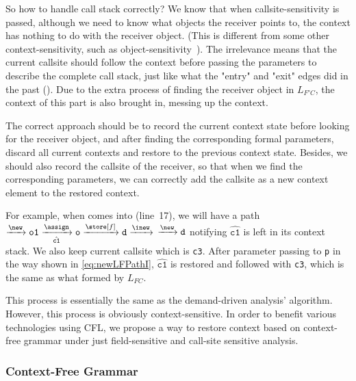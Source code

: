 So how to handle call stack correctly?
We know that when callsite-sensitivity is passed, although we need to know what objects the receiver points to, the context has nothing to do with the receiver object.
(This is different from some other context-sensitivity, such as object-sensitivity~\cite{objsens}). The irrelevance means that the current callsite should follow the context before passing the parameters to describe the complete call stack, just like what the "entry" and "exit" edges did in the past ().
Due to the extra process of finding the receiver object in $L_{F'C}$, the context of this part is also brought in, messing up the context.

The correct approach should be to record the current context state before looking for the receiver object, and after finding the corresponding formal parameters, discard all current contexts and restore to the previous context state.
Besides, we should also record the callsite of the receiver, so that when we find the corresponding parameters, we can correctly add the callsite as a new context element to the restored context.

For example, when  comes into  (line~17), we will have a path $\xrightarrow{\new}
\texttt{o1}\xrightarrow[\hat{\mathtt{c1}}]{\assign}
\texttt{o} \xrightarrow{\store[f]} \texttt{d}
\xrightarrow{\inew}$  
$ \xrightarrow{\new} \texttt{d}$ notifying $\hat{\mathtt{c1}}$ is left in its context stack. We also keep current callsite which is \texttt{c3}. After parameter passing to \texttt{p} in the way shown in \cref{eq:newLFPathI}, $\hat{\mathtt{c1}}$ is restored and followed with \texttt{c3}, which is the same as what formed by $L_{FC}$.

This process is essentially the same as the demand-driven analysis' algorithm.
However, this process is obviously context-sensitive.
In order to benefit various technologies using CFL, we propose a way to restore context based on context-free grammar under just field-sensitive and call-site sensitive analysis.

\subsubsection{Context-Free Grammar}



